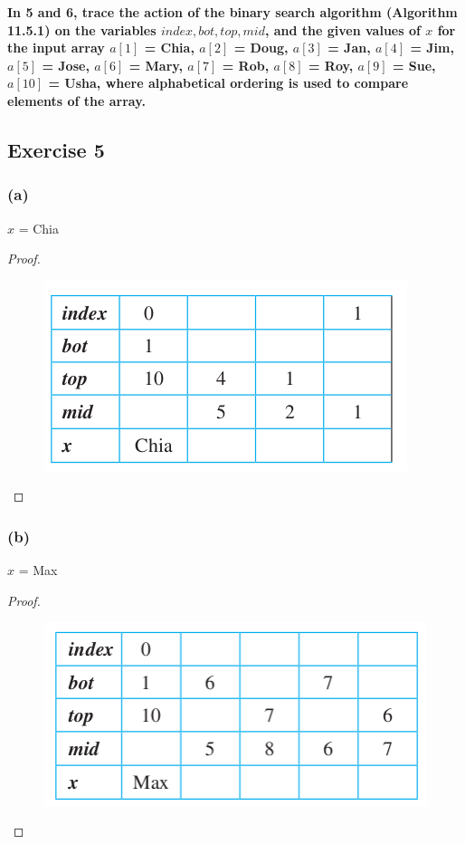 \documentclass[14pt]{extarticle}
\newcommand{\cy}{\color{cyan}}
\begin{document}
{\bf \cy In 5 and 6, trace the action of the binary search algorithm (Algorithm 11.5.1) on the variables \(index, bot,
top, mid\), and the given values of \(x\) for the input array \(a[1]\) = Chia, \(a[2]\) = Doug, \(a[3]\) = Jan, \(a[4]\) =
Jim, \(a[5]\) = Jose, \(a[6]\) = Mary, \(a[7]\) = Rob, \(a[8]\) = Roy, \(a[9]\) = Sue, \(a[10]\) = Usha, where alphabetical
ordering is used to compare elements of the array.}

\subsection{Exercise 5}
\subsubsection{(a)}
\(x\) = Chia
\begin{proof}
    \begin{figure}[ht!]
        \centering
        \includegraphics[scale=0.5]{../images/11.5.5.a.png}
    \end{figure}
\end{proof}

\subsubsection{(b)}
\(x\) = Max
\begin{proof}
    \begin{figure}[ht!]
        \centering
        \includegraphics[scale=0.5]{../images/11.5.5.b.png}
    \end{figure}
\end{proof}
\end{document}
